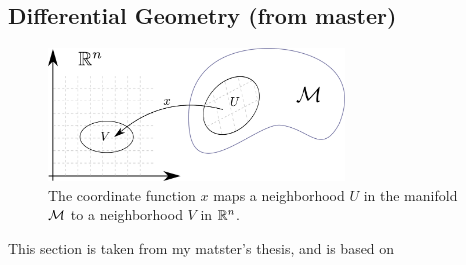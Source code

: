 \subsection{Differential Geometry (from master)}


\begin{figure}[!htp]
    \centering
    \includegraphics[width=0.7\textwidth]{figurer/coordinate_function.pdf}
    \caption{
        The coordinate function $x$ maps a neighborhood $U$ in the manifold $\mathcal M$ to a neighborhood $V$ in $\mathbb R^n$.
        }
    \label{fig: coordinate function}
\end{figure}



This section is taken from my matster's thesis, and is based on~


